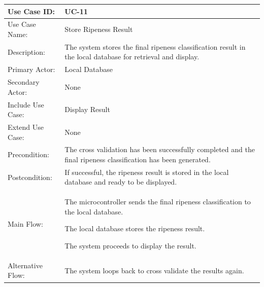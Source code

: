 \begin{thesisprose}
\FloatBarrier
\begingroup
\small
\setlength{\tabcolsep}{3pt}
\renewcommand{\arraystretch}{1.14}
\setlength{\arrayrulewidth}{0.625pt}
\def\LTcaptype{uncaptionedgrid}
\begin{longtable}{|>{\raggedright\arraybackslash}p{}|>{\raggedright\arraybackslash}p{}|}
\hline
Use Case ID: & UC-11 \\
\hline
Use Case Name: & Store Ripeness Result \\
\hline
Description: & The system stores the final ripeness classification result in the local database for retrieval and display. \\
\hline
Primary Actor: & Local Database \\
\hline
Secondary Actor: & None \\
\hline
Include Use Case: & Display Result \\
\hline
Extend Use Case: & None \\
\hline
Precondition: & The cross validation has been successfully completed and the final ripeness classification has been generated. \\
\hline
Postcondition: & If successful, the ripeness result is stored in the local database and ready to be displayed. \\
\hline
Main Flow: & The microcontroller sends the final ripeness classification to the local database.\par The local database stores the ripeness result.\par The system proceeds to display the result. \\
\hline
Alternative Flow: & The system loops back to cross validate the results again. \\
\hline
\end{longtable}
\endgroup


\end{thesisprose}

